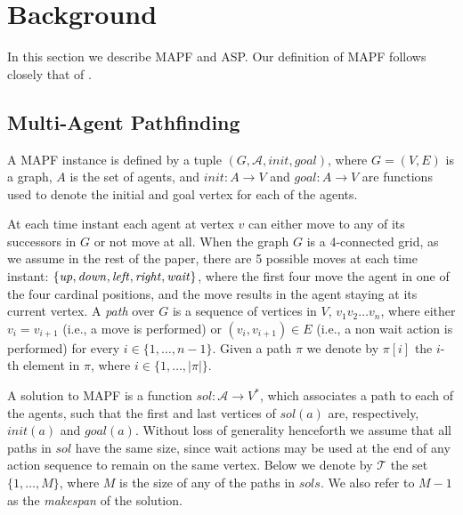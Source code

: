 \section{Background}
In this section we describe MAPF and ASP. Our definition of MAPF follows closely that of .

\subsection{Multi-Agent Pathfinding}
A MAPF instance is defined by a tuple $(G,\mathcal{A},init,goal)$, where $G=(V,E)$ is a graph, $A$ is the set of agents, and $init:A\rightarrow V$ and $goal:A\rightarrow V$ are functions used to denote the initial and goal vertex for each of the agents.

At each time instant each agent at vertex $v$ can either move to any of its successors in $G$ or not move at all. When the graph $G$ is a 4-connected grid, as we assume in the rest of the paper, there are 5 possible moves at each time instant: $\{\mathit{up},\mathit{down},\mathit{left},\mathit{right},\mathit{wait}\}$, where the first four move the agent in one of the four cardinal positions, and the \Wait move results in the agent staying at its current vertex. A \emph{path} over $G$ is a sequence of vertices in  $V$, $v_1v_2\ldots v_n$, where either $v_i=v_{i+1}$ (i.e., a \Wait move is performed) or $(v_i,v_{i+1})\in E$ (i.e., a non wait action is performed) for every $i\in\{1,\ldots,n-1\}$. Given a path $\pi$ we denote by $\pi[i]$ the $i$-th element in $\pi$, where $i\in\{1,\ldots,|\pi|\}$.

A solution to MAPF is a function $sol:\mathcal{A}\rightarrow V^*$, which associates a path to each of the agents, such that the first and last vertices of $sol(a)$ are, respectively, $init(a)$ and $goal(a)$. Without loss of generality henceforth we assume that all paths in $sol$ have the same size, since wait actions may be used at the end of any action sequence to remain on the same vertex. Below we denote by $\mathcal{T}$ the set $\{1,\ldots,M\}$, where $M$ is the size of any of the paths in $sols$. We also refer to $M-1$ as the \emph{makespan} of the solution.

